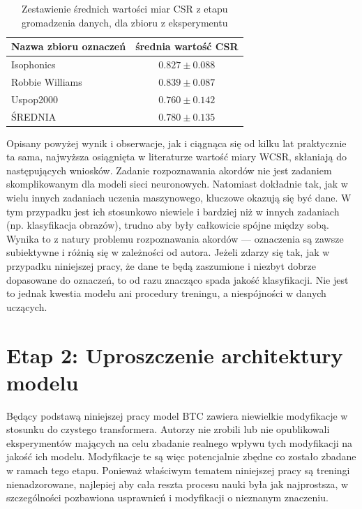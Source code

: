 \begin{table}
    \centering
    \caption{Zestawienie średnich wartości miar CSR z etapu gromadzenia danych, dla zbioru z eksperymentu }
    \label{tab:results_btc-reproduce_extra}
    \begin{tabular}{|l|c|}
        \hline Nazwa zbioru oznaczeń & średnia wartość CSR \\ \hline
        Isophonics  & $0.827 \pm 0.088$ \\
        Robbie Williams & $0.839 \pm 0.087$ \\
        Uspop2000 & $0.760 \pm 0.142$ \\
        \hline ŚREDNIA & $0.780 \pm 0.135$ \\ \hline
    \end{tabular}
\end{table}

Opisany powyżej wynik i obserwacje, jak i ciągnąca się od kilku lat praktycznie ta sama, najwyższa osiągnięta w literaturze wartość miary WCSR, skłaniają do następujących wniosków. Zadanie rozpoznawania akordów nie jest zadaniem skomplikowanym dla modeli sieci neuronowych. Natomiast dokładnie tak, jak w wielu innych zadaniach uczenia maszynowego, kluczowe okazują się być dane. W tym przypadku jest ich stosunkowo niewiele i bardziej niż w innych zadaniach (np. klasyfikacja obrazów), trudno aby były całkowicie spójne między sobą. Wynika to z natury problemu rozpoznawania akordów --- oznaczenia są zawsze subiektywne i różnią się w zależności od autora. Jeżeli zdarzy się tak, jak w przypadku niniejszej pracy, że dane te będą zaszumione i niezbyt dobrze dopasowane do oznaczeń, to od razu znacząco spada jakość klasyfikacji. Nie jest to jednak kwestia modelu ani procedury treningu, a niespójności w danych uczących.



\section{Etap 2: Uproszczenie architektury modelu}

Będący podstawą niniejszej pracy model BTC zawiera niewielkie modyfikacje w stosunku do czystego transformera. Autorzy nie zrobili lub nie opublikowali eksperymentów mających na celu zbadanie realnego wpływu tych modyfikacji na jakość ich modelu. Modyfikacje te są więc potencjalnie zbędne co zostało zbadane w ramach tego etapu. Ponieważ właściwym tematem niniejszej pracy są treningi nienadzorowane, najlepiej aby cała reszta procesu nauki była jak najprostsza, w szczególności pozbawiona usprawnień i modyfikacji o nieznanym znaczeniu.

